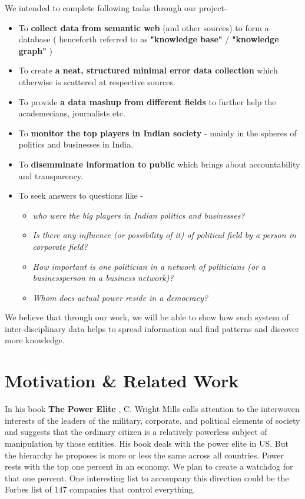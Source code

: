 We intended to complete following tasks through our project-
\begin{itemize}

    \item To \textbf{collect data from semantic web} (and other sources) to form a database ( henceforth referred to as \textbf{"knowledge base"} / \textbf{"knowledge graph"} )
    \item To create \textbf{ a neat, structured minimal error data collection } which otherwise is scattered at respective sources.
    \item To provide \textbf{ a data mashup from different fields } to further help the academecians, journalists etc.
    \item To \textbf{ monitor the top players in Indian society } - mainly in the spheres of politics and businesses in India.
    \item To \textbf{ disemminate information to public }  which brings about accountability and transparency. 
    \item  To seek answers to questions like -
        \begin{itemize}
         \item \emph{ who were the big players in Indian politics and businesses? }
         \item \emph{ Is there any influence (or possibility of it) of political field by a person in corporate field? }
         \item \emph{ How important is one politician in a network of politicians (or a businessperson in a business network)? }
         \item \emph{ Whom does actual power reside in a democracy? }
        \end{itemize}

\end{itemize}
We believe that through our work, we will be able to show how such system of inter-disciplinary data helps to spread information and find patterns and discover more knowledge.

\section{Motivation \& Related Work}

In his book \textbf{The Power Elite} \cite{Mills}, C. Wright Mills calls attention to the interwoven interests of the leaders of the military, corporate, and political elements of society and suggests that the ordinary citizen is a relatively powerless subject of manipulation by those entities. His book deals with the power elite in US. But the hierarchy he proposes is more or less the same across all countries. Power rests with the top one percent in an economy. We plan to create a watchdog for that one percent. One interesting list to accompany this direction could be the Forbes list \cite{FORBES} of 147 companies that control everything. 

